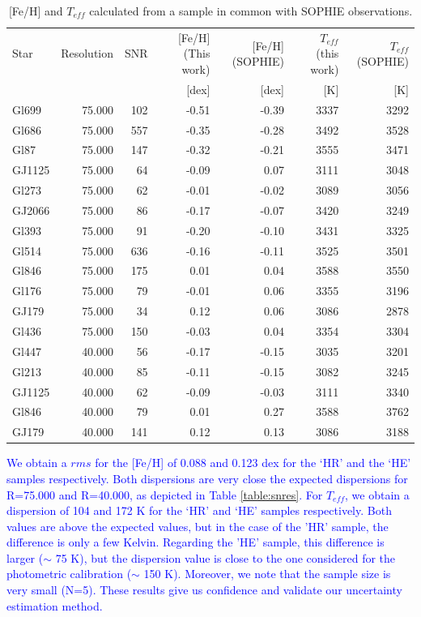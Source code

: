 \documentclass{aa}
\begin{document}
\begin{table}[]
\centering
\caption[]{[Fe/H] and $T_{eff}$ calculated from a sample in common with SOPHIE observations.}
\label{table:sophie}
\begin{center}
\begin{tabular}{l r r r r r r}
\hline
\hline
Star & Resolution & SNR & [Fe/H] (This work) & [Fe/H] (SOPHIE) & $T_{eff}$ (this work) & $T_{eff}$ (SOPHIE) \\
     &            &     &  [dex] & [dex]       &  [K] & [K]       \\
\hline
Gl699 & 75.000 & 102 & -0.51 & -0.39 & 3337 & 3292 \\
Gl686 & 75.000 & 557 & -0.35 & -0.28 & 3492 & 3528 \\
Gl87 & 75.000 & 147 & -0.32 & -0.21 & 3555 & 3471 \\
GJ1125 & 75.000 & 64 & -0.09 & 0.07 & 3111 & 3048 \\
Gl273 & 75.000 & 62 & -0.01 & -0.02 & 3089 & 3056 \\
GJ2066 & 75.000 & 86 & -0.17 & -0.07 & 3420 & 3249 \\
Gl393 & 75.000 & 91 & -0.20 & -0.10 & 3431 & 3325 \\
Gl514 & 75.000 & 636 & -0.16 & -0.11 & 3525 & 3501 \\
Gl846 & 75.000 & 175 & 0.01 & 0.04 & 3588 & 3550 \\
Gl176 & 75.000 & 79 & -0.01 & 0.06 & 3355 & 3196 \\
GJ179 & 75.000 & 34 & 0.12 & 0.06 & 3086 & 2878 \\
Gl436 & 75.000 & 150 & -0.03 & 0.04 & 3354 & 3304 \\
Gl447 & 40.000 & 56 & -0.17 & -0.15 & 3035 & 3201 \\
Gl213 & 40.000 & 85 & -0.11 & -0.15 & 3082 & 3245 \\
GJ1125 & 40.000 & 62 & -0.09 & -0.03 & 3111 & 3340 \\
Gl846 & 40.000 & 79 & 0.01 & 0.27 & 3588 & 3762 \\
GJ179 & 40.000 & 141 & 0.12 & 0.13 & 3086 & 3188 \\
\hline
\end{tabular}
\end{center}
\end{table}

\textcolor{blue}{We obtain a $rms$ for the [Fe/H] of 0.088 and 0.123 dex for the `HR' and the `HE' samples respectively. Both dispersions are very close the expected dispersions for R=75.000 and R=40.000, as depicted in Table \ref{table:snres}. For $T_{eff}$, we obtain a dispersion of 104 and 172 K for the `HR' and `HE' samples respectively. Both values are above the expected values, but in the case of the 'HR' sample, the difference is only a few Kelvin. Regarding the 'HE' sample, this difference is larger ($\sim$ 75 K), but the dispersion value is close to the one considered for the photometric calibration ($\sim$ 150 K). Moreover, we note that the sample size is very small (N=5). These results give us confidence and validate our uncertainty estimation method.
}
\end{document}
